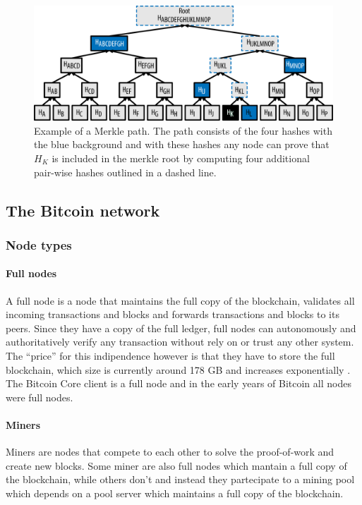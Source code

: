 \begin{figure}[!htb]
	\centering
	\includegraphics[width=1\linewidth]{img/merkle-tree-path.png}
	\caption{Example of a Merkle path. The path consists of the four hashes with the
  blue background and with these hashes any node can prove that $H_K$ is included
  in the merkle root by computing four additional pair-wise hashes outlined in a
  dashed line.  }
	\label{fig:merkle-tree-path}
\end{figure}








\subsection{The Bitcoin network}

\subsubsection{Node types}

\paragraph{Full nodes} A full node is a node that maintains the full copy of the
blockchain, validates all incoming transactions and blocks and forwards
transactions and blocks to its peers. Since they have a copy of the full ledger,
full nodes can autonomously and authoritatively verify any transaction without
rely on or trust any other system. The ``price'' for this indipendence however
is that they have to store the full blockchain, which size is currently around
178 GB and increases exponentially \cite{statista}. The Bitcoin Core client
is a full node and in the early years of Bitcoin all nodes were full nodes.

\paragraph{Miners} Miners are nodes that compete to each other to solve the
proof-of-work and create new blocks. Some miner are also full nodes which
mantain a full copy of the blockchain, while others don't and instead they
partecipate to a mining pool which depends on a pool server which maintains a
full copy of the blockchain.

